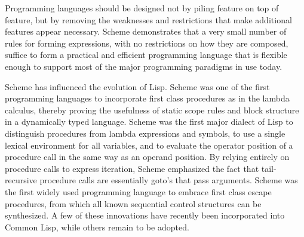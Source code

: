 
\label{historysection}

Programming languages should be designed not by piling feature on top of
feature, but by removing the weaknesses and restrictions that make additional
features appear necessary.  Scheme demonstrates that a very small number
of rules for forming expressions, with no restrictions on how they are
composed, suffice to form a practical and efficient programming language
that is flexible enough to support most of the major programming
paradigms in use today.

Scheme has influenced the evolution of Lisp.  Scheme
was one of the first programming languages to incorporate first class
procedures as in the lambda calculus, thereby proving the usefulness of
static scope rules and block structure in a dynamically typed language.
Scheme was the first major dialect of Lisp to distinguish procedures
from lambda expressions and symbols, to use a single lexical
environment for all variables, and to evaluate the operator position
of a procedure call in the same way as an operand position.  By relying
entirely on procedure calls to express iteration, Scheme emphasized the
fact that tail-recursive procedure calls are essentially goto's that
pass arguments.  Scheme was the first widely used programming language to
embrace first class escape procedures, from which all known
sequential control structures can be synthesized.  A few of these
innovations have recently been incorporated into Common Lisp, while
others remain to be adopted.


